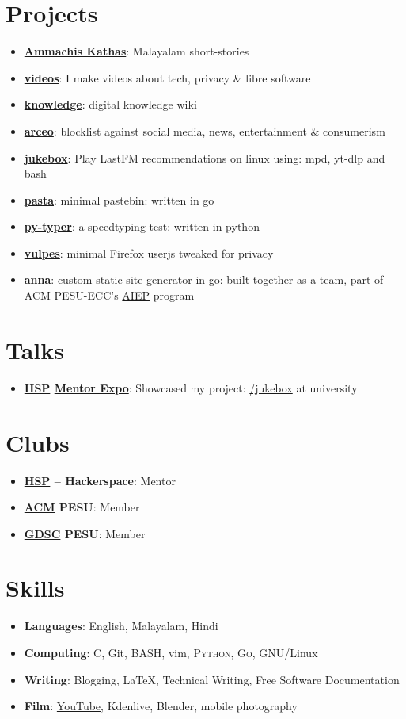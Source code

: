 \documentclass[letterpaper, 11pt]{article}
\newcommand{\resumeItem}[2]{
  \item\small{
    \textbf{#1}{: #2 \vspace{-2pt}}
  }
}
\newcommand{\resumeSubItem}[2]{\resumeItem{#1}{#2}\vspace{-4pt}}
\newcommand{\resumeSubHeadingListStart}{\begin{itemize}[leftmargin=*]}
\newcommand{\resumeSubHeadingListEnd}{\end{itemize}}
\begin{document}
{\section{Projects}
  \resumeSubHeadingListStart
    \resumeSubItem{\href{https://polarhive.net/ammachiskathas}{Ammachis Kathas}}
      {Malayalam short-stories}
    \resumeSubItem{\href{https://polarhive.net/videos}{videos}}
      {I make videos about tech, privacy \& libre software}
    \resumeSubItem{\href{https://polarhive.net/knowledge}{knowledge}}
      {digital knowledge wiki}
    \resumeSubItem{\href{https://polarhive.net/arceo}{arceo}}
      {blocklist against social media, news, entertainment \& consumerism}
    \resumeSubItem{\href{https://polarhive.net/jukebox}{jukebox}}
      {Play LastFM recommendations on linux using: mpd, yt-dlp and bash}
    \resumeSubItem{\href{https://polarhive.net/pasta}{pasta}}
      {minimal pastebin: written in go}
    \resumeSubItem{\href{https://polarhive.net/py-typer}{py-typer}}
      {a speedtyping-test: written in python}
    \resumeSubItem{\href{https://polarhive.net/vulpes}{vulpes}}
      {minimal Firefox userjs tweaked for privacy}
    \resumeSubItem{\href{https://github.com/acmpesuecc/anna}{anna}}
      {custom static site generator in go: built together as a team, part of ACM PESU-ECC's {\href{https://acmpesuecc.github.io/aiep}{AIEP}} program}
  \resumeSubHeadingListEnd

\section{Talks}
  \resumeSubHeadingListStart
    \resumeSubItem{\href{https://www.hsp-ec.xyz}{HSP} {\href{https://www.instagram.com/p/CzydraKSE8q/}{Mentor Expo}}} 
    {Showcased my project: {\href{https://polarhive.net/jukebox}{/jukebox}} at university}
  \resumeSubHeadingListEnd

\section{Clubs}
  \resumeSubHeadingListStart
    \resumeSubItem{\href{https://www.hsp-ec.xyz}{HSP} -- Hackerspace}
     {Mentor}
    \resumeSubItem{\href{https://pesuecc.acm.org}{ACM} PESU} 
     {Member}
    \resumeSubItem{\href{https://gdsc.community.dev/pes-university-electronic-city-campus-bengaluru/}{GDSC} PESU}
     {Member}
  \resumeSubHeadingListEnd

\section{Skills}
  \resumeSubHeadingListStart
    \resumeSubItem{Languages}
      {English, Malayalam, Hindi}
    \resumeSubItem{Computing}
      {\textsc{C}, Git, {\textsc{BASH}}, vim, \textsc{Python}, {\textsc{Go}}, GNU/Linux}
    \resumeSubItem{Writing}
      {Blogging, \LaTeX, Technical Writing, Free Software Documentation}
    \resumeSubItem{Film}
      {{\href{https://polarhive.net/videos}{YouTube}}, Kdenlive, Blender, mobile photography}
  \resumeSubHeadingListEnd

}
\end{document}
